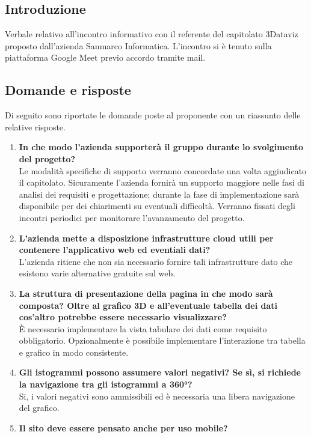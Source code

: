 \documentclass[10pt]{article}
\begin{document}
\subsection{Introduzione}
Verbale relativo all'incontro informativo con il referente del capitolato 3Dataviz proposto dall'azienda Sanmarco Informatica.
L'incontro si è tenuto sulla piattaforma Google Meet previo accordo tramite mail.

\subsection{Domande e risposte}
Di seguito sono riportate le domande poste al proponente con un riassunto delle relative risposte.
\begin{enumerate}
    \item \textbf{In che modo l'azienda supporterà il gruppo durante lo svolgimento del progetto?} \\
        Le modalità specifiche di supporto verranno concordate una volta aggiudicato il capitolato. 
        Sicuramente l'azienda fornirà un supporto maggiore nelle fasi di analisi dei requisiti e progettazione; durante la fase di implementazione sarà disponibile per dei chiarimenti su eventuali difficoltà. Verranno fissati degli incontri periodici per monitorare l'avanzamento del progetto.
    \item \textbf{L'azienda mette a disposizione infrastrutture cloud utili per contenere l'applicativo web ed eventiali dati?} \\
            L'azienda ritiene che non sia necessario fornire tali infrastrutture dato che esistono varie alternative gratuite sul web.
    \item \textbf{La struttura di presentazione della pagina in che modo sarà composta? Oltre al grafico 3D e all'eventuale tabella dei dati cos'altro potrebbe essere necessario visualizzare?}\\
        È necessario implementare la vista tabulare dei dati come requisito obbligatorio. Opzionalmente è possibile implementare l'interazione tra tabella e grafico in modo consistente.
    \item \textbf{Gli istogrammi possono assumere valori negativi? Se sì, si richiede la navigazione tra gli istogrammi a 360°? }\\
        Si, i valori negativi sono ammissibili ed è necessaria una libera navigazione del grafico.
    \item \textbf{Il sito deve essere pensato anche per uso mobile?} \\

\end{enumerate}
\end{document}
